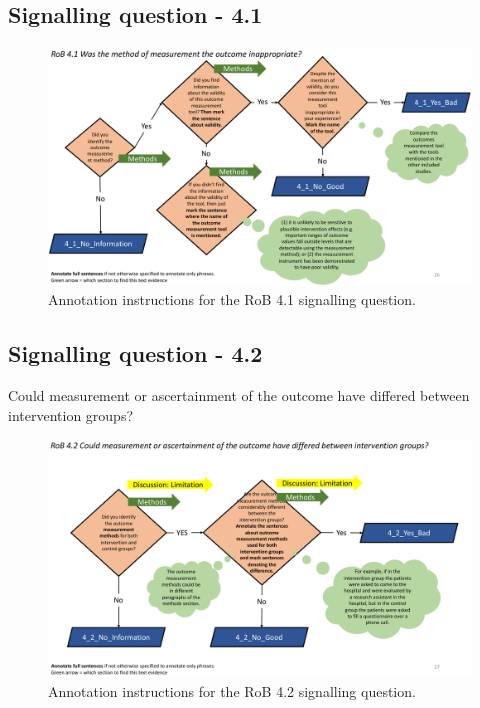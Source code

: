 \documentclass[sn-mathphys,Numbered]{sn-jnl}%
\begin{document}
\subsection*{Signalling question - 4.1 }
%
\begin{figure}[hbt]
    \centering
    \includegraphics[width=\textwidth]{figures/4_1.pdf}
    \caption{Annotation instructions for the RoB 4.1 signalling question.}
    \label{fig:4_1}
\end{figure}
%
%
%
\subsection*{Signalling question - 4.2 }
%
Could measurement or ascertainment of the outcome have differed between intervention groups?

\begin{figure}[hbt]
    \centering
    \includegraphics[width=\textwidth]{figures/4_2.pdf}
    \caption{Annotation instructions for the RoB 4.2 signalling question.}
    \label{fig:4_2}
\end{figure}
%
%
%
\end{document}
